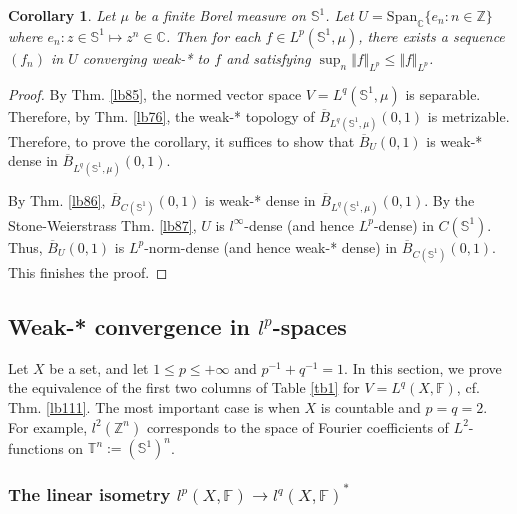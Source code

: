 \documentclass[12pt,b5paper,notitlepage]{article}
\theoremstyle{definition}
\theoremstyle{plain}
\newtheorem{co}[df]{Corollary}
\newcommand{\ovl}{\overline}
\newcommand{\Span}{\mathrm{Span}}
\newcommand{\Cbb}{\mathbb C}
\newcommand{\Zbb}{\mathbb Z}
\newcommand{\Sbb}{{\mathbb S}}
\newcommand{\Fbb}{\mathbb F}
\numberwithin{equation}{section}
\begin{document}
\begin{co}
Let $\mu$ be a finite Borel measure on $\Sbb^1$. Let $U=\Span_\Cbb\{e_n:n\in\Zbb\}$ where $e_n:z\in\Sbb^1\mapsto z^n\in\Cbb$. Then for each $f\in L^p(\Sbb^1,\mu)$, there exists a sequence $(f_n)$ in $U$ converging weak-* to $f$ and satisfying $\sup_n\Vert f\Vert_{L^p}\leq\Vert f\Vert_{L^p}$.
\end{co}

\begin{proof}
By Thm. \ref{lb85}, the normed vector space $V=L^q(\Sbb^1,\mu)$ is separable. Therefore, by Thm. \ref{lb76}, the weak-* topology of $\ovl B_{L^q(\Sbb^1,\mu)}(0,1)$ is metrizable. Therefore, to prove the corollary, it suffices to show that $\ovl B_U(0,1)$ is weak-* dense in $\ovl B_{L^q(\Sbb^1,\mu)}(0,1)$. 

By Thm. \ref{lb86}, $\ovl B_{C(\Sbb^1)}(0,1)$ is weak-* dense in $\ovl B_{L^q(\Sbb^1,\mu)}(0,1)$. By the Stone-Weierstrass Thm. \ref{lb87}, $U$ is $l^\infty$-dense (and hence $L^p$-dense) in $C(\Sbb^1)$. Thus, $\ovl B_U(0,1)$ is $L^p$-norm-dense (and hence weak-* dense) in $\ovl B_{C(\Sbb^1)}(0,1)$. This finishes the proof.
\end{proof}



\subsection{Weak-* convergence in $l^p$-spaces}



Let $X$ be a set, and let $1\leq p\leq+\infty$ and $p^{-1}+q^{-1}=1$. In this section, we prove the equivalence of the first two columns of Table \ref{tb1} for $V=L^q(X,\Fbb)$, cf. Thm. \ref{lb111}. The most important case is when $X$ is countable and $p=q=2$. For example, $l^2(\Zbb^n)$ corresponds to the space of Fourier coefficients of $L^2$-functions on $\mathbb T^n:=(\Sbb^1)^n$.








\subsubsection{The linear isometry $l^p(X,\Fbb)\rightarrow l^q(X,\Fbb)^*$}
\end{document}
